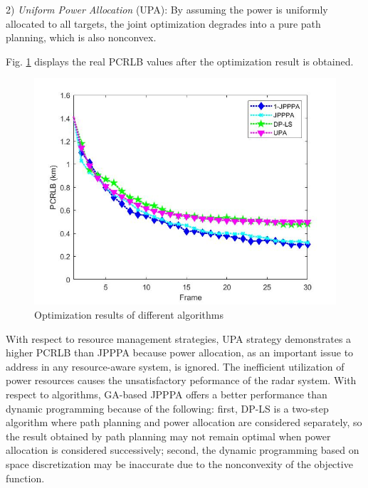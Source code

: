 \documentclass[12pt,journal,draftclsnofoot,onecolumn]{IEEEtran}
\begin{document}
2) \emph{Uniform Power Allocation} (UPA): By assuming the power is uniformly allocated to all targets, the joint optimization degrades into a pure path planning, which is also nonconvex.

Fig. \ref{fig:PCRLB} displays the real PCRLB values after the optimization result is obtained.

\begin{figure}
	\centering
	\includegraphics[scale=0.36]{PCRLB.jpg}
	\caption{Optimization results of different algorithms}
	\label{fig:PCRLB}
\end{figure}



With respect to resource management strategies, UPA strategy demonstrates a higher PCRLB than JPPPA because power allocation, as an important issue to address in any resource-aware system, is ignored. The inefficient utilization of power resources causes the unsatisfactory peformance of the radar system. With respect to algorithms, GA-based JPPPA offers a better performance than dynamic programming because of the following: first, DP-LS is a two-step algorithm where path planning and power allocation are considered separately, so the result obtained by path planning may not remain optimal when power allocation is considered successively; second, the dynamic programming based on space discretization may be inaccurate due to the nonconvexity of the objective function. 
\end{document}
